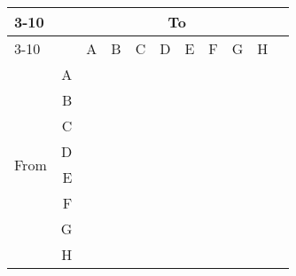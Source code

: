 \documentclass{article}
\begin{document}
\begin{tabular}{|lr|l|l|l|l|l|l|l|l|l|} \cline{3-10}
\multicolumn{1}{l}{} && \multicolumn{8}{c|}{To} \\ \cline{3-10}
\multicolumn{1}{l}{} & & A & B & C & D & E & F & G & H \\ \hline
\multirow{8}{*}{\begin{sideways}From\end{sideways}}
& \multicolumn{1}{|r|}{A} &   &   &   &   &   &   &   &   \\ \cline{2-10}
& \multicolumn{1}{|r|}{B} &   &   &   &   &   &   &   &   \\ \cline{2-10}
& \multicolumn{1}{|r|}{C} &   &   &   &   &   &   &   &   \\ \cline{2-10}
& \multicolumn{1}{|r|}{D} &   &   &   &   &   &   &   &   \\ \cline{2-10}
& \multicolumn{1}{|r|}{E} &   &   &   &   &   &   &   &   \\ \cline{2-10}
& \multicolumn{1}{|r|}{F} &   &   &   &   &   &   &   &   \\ \cline{2-10}
& \multicolumn{1}{|r|}{G} &   &   &   &   &   &   &   &   \\ \cline{2-10}
& \multicolumn{1}{|r|}{H} &   &   &   &   &   &   &   &   \\ \hline
\end{tabular}
\end{document}
